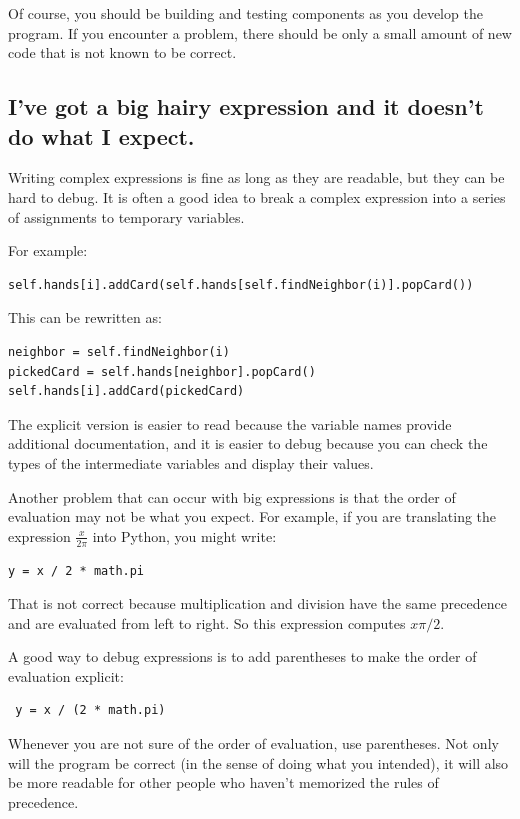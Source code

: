 \documentclass[10pt]{book}
\begin{document}
{Of course, you should be building and testing components as you
develop the program.  If you encounter a problem,
there should be only a small amount of new code
that is not known to be correct.


\subsection{I've got a big hairy expression and it doesn't
do what I expect.}


Writing complex expressions is fine as long as they are readable,
but they can be hard to debug.  It is often a good idea to
break a complex expression into a series of assignments to
temporary variables.

For example:

\beforeverb
\begin{verbatim}
self.hands[i].addCard(self.hands[self.findNeighbor(i)].popCard())
\end{verbatim}
\afterverb
%
This can be rewritten as:

\beforeverb
\begin{verbatim}
neighbor = self.findNeighbor(i)
pickedCard = self.hands[neighbor].popCard()
self.hands[i].addCard(pickedCard)
\end{verbatim}
\afterverb
%
The explicit version is easier to read because the variable
names provide additional documentation, and it is easier to debug
because you can check the types of the intermediate variables
and display their values.


Another problem that can occur with big expressions is
that the order of evaluation may not be what you expect.
For example, if you are translating the expression
$\frac{x}{2 \pi}$ into Python, you might write:

\beforeverb
\begin{verbatim}
y = x / 2 * math.pi
\end{verbatim}
\afterverb
%
That is not correct because multiplication and division have
the same precedence and are evaluated from left to right.
So this expression computes $x \pi / 2$.

A good way to debug expressions is to add parentheses to make
the order of evaluation explicit:

\beforeverb
\begin{verbatim}
 y = x / (2 * math.pi)
\end{verbatim}
\afterverb
%
Whenever you are not sure of the order of evaluation, use
parentheses.  Not only will the program be correct (in the sense
of doing what you intended), it will also be more readable for
other people who haven't memorized the rules of precedence.


}
\end{document}
